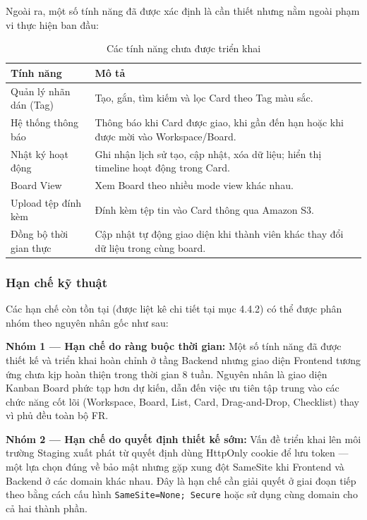 Ngoài ra, một số tính năng đã được xác định là cần thiết nhưng nằm ngoài phạm vi thực hiện ban đầu:

\begin{table}[H]
\centering
\begin{tabular}{|p{4cm}|p{10cm}|}
\hline
\textbf{Tính năng} & \textbf{Mô tả} \\
\hline
Quản lý nhãn dán (Tag) & Tạo, gắn, tìm kiếm và lọc Card theo Tag màu sắc. \\
\hline
Hệ thống thông báo & Thông báo khi Card được giao, khi gần đến hạn hoặc khi được mời vào Workspace/Board. \\
\hline
Nhật ký hoạt động & Ghi nhận lịch sử tạo, cập nhật, xóa dữ liệu; hiển thị timeline hoạt động trong Card. \\
\hline
Board View & Xem Board theo nhiều mode view khác nhau. \\
\hline
Upload tệp đính kèm & Đính kèm tệp tin vào Card thông qua Amazon S3. \\
\hline
Đồng bộ thời gian thực & Cập nhật tự động giao diện khi thành viên khác thay đổi dữ liệu trong cùng board. \\
\hline
\end{tabular}
\caption{Các tính năng chưa được triển khai}
\label{tab:unimplemented_features}
\end{table}

\subsubsection{Hạn chế kỹ thuật}

Các hạn chế còn tồn tại (được liệt kê chi tiết tại mục 4.4.2) có thể được phân nhóm theo nguyên nhân gốc như sau:

\textbf{Nhóm 1 — Hạn chế do ràng buộc thời gian:}
Một số tính năng đã được thiết kế và triển khai hoàn chỉnh ở tầng Backend nhưng giao diện Frontend tương ứng chưa kịp hoàn thiện trong thời gian 8 tuần. Nguyên nhân là giao diện Kanban Board phức tạp hơn dự kiến, dẫn đến việc ưu tiên tập trung vào các chức năng cốt lõi (Workspace, Board, List, Card, Drag-and-Drop, Checklist) thay vì phủ đều toàn bộ FR.

\textbf{Nhóm 2 — Hạn chế do quyết định thiết kế sớm:}
Vấn đề triển khai lên môi trường Staging xuất phát từ quyết định dùng HttpOnly cookie để lưu token — một lựa chọn đúng về bảo mật nhưng gặp xung đột SameSite khi Frontend và Backend ở các domain khác nhau. Đây là hạn chế cần giải quyết ở giai đoạn tiếp theo bằng cách cấu hình \texttt{SameSite=None; Secure} hoặc sử dụng cùng domain cho cả hai thành phần.

